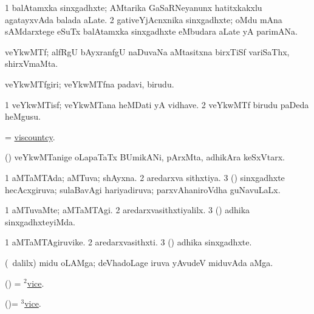 \noindent 
\gl{\pagu}
\expl{}
\bmng
\bnum
\num{1}  balAtamxka sinxgadhxte; AMtarika GaSaRNeyanunx hatitxkakxlu agatayxvAda balada aLate. 
\num{2} gativeYjAcnxnika sinxgadhxte; oMdu mAna sAMdarxtege eSuTx balAtamxka sinxgadhxte eMbudara aLate yA parimANa. 
\enum
\emng
\eentry

\bentry 
{} 
\gl{\nA}
\expl{}
\bmng
 veYkwMTf; alfRgU bAyxranfgU naDuvaNa aMtasitxna birxTiSf variSaThx, shirxVmaMta. 
\emng
\eentry

\bentry 
{} 
\gl{\nA}
\bmng
 veYkwMTfgiri; veYkwMTfna padavi, birudu. 
\emng
\eentry

\bentry
{} 
\gl{\nA}
\expl{}
\bmng
\bnum
\num{1} veYkwMTisf; veYkwMTana heMDati yA vidhave. 
\num{2} veYkwMTf birudu paDeda heMgusu. 
\enum
\emng
\eentry

\bentry 
{} 
\gl{\nA}
\expl{}
\bmng
 = \hyperlink{viscountcy}{viscountcy}. 
\emng
\eentry

\bentry
{} 
\gl{\nA}
\bmng
 (\ca) veYkwMTanige oLapaTaTx BUmikANi, pArxMta, adhikAra keSxVtarx. 
\emng
\eentry

\bentry
{} 
\gl{\gu}
\expl{}
\bmng
\bnum
\num{1} aMTaMTAda; aMTuva; shAyxna. 
\num{2} aredarxva sithxtiya. 
\num{3} (\Bwvi) sinxgadhxte hecAcxgiruva; sulaBavAgi hariyadiruva; parxvAhaniroVdha guNavuLaLx. 
\enum
\emng
\eentry

\bentry
{} 
\gl{\kirxvi}
\expl{}
\bmng
\bnum
\num{1} aMTuvaMte; aMTaMTAgi. 
\num{2} aredarxvasithxtiyalilx. 
\num{3} (\Bwvi) adhika sinxgadhxteyiMda. 
\enum
\emng
\eentry

\bentry
{} 
\gl{\nA}
\expl{}
\bmng
\bnum
\num{1} aMTaMTAgiruvike. 
\num{2} aredarxvasithxti. 
\num{3} (\Bwvi) adhika sinxgadhxte. 
\enum
\emng
\eentry

\bentry
{} 
\gl{\nA}
\bmng
 (\sA\ \bava dalilx) midu oLAMga; deVhadoLage iruva yAvudeV miduvAda aMga. 
\emng
\eentry

\bentry 
{} 
\gl{\nA}
\expl{}
\bmng
 (\ame) = \hyperlink{vice(2)}{$^2$vice}. 
\emng
\eentry

\bentry
{} 
\gl{\sakirx}
\expl{}
\bmng
 (\ame)= \hyperlink{vice(3)}{$^3$vice}. 
\emng
\eentry

